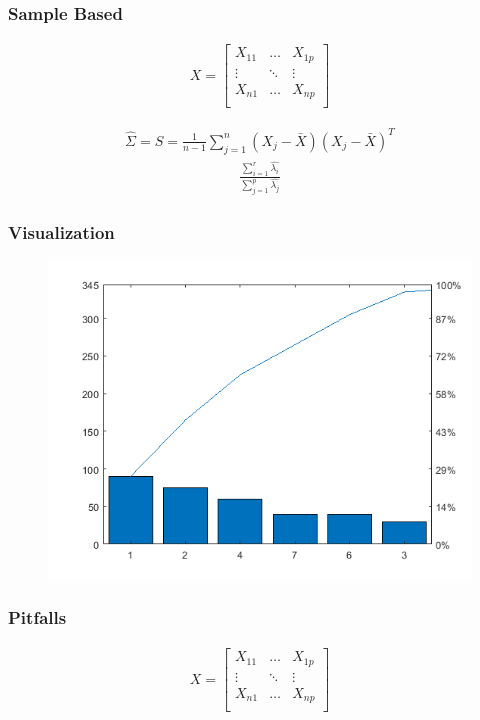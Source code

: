\documentclass[aspectratio=169,10pt,t]{beamer}
\begin{document}
\begin{frame}[t]
    \frametitle{Sample Based}

    \begin{align*}
    X = \begin{bmatrix}
			X_{11} & \hdots & X_{1p} \\
        \vdots &  \ddots & \vdots  \\
				X_{n1} & \hdots & X_{np} \\
    \end{bmatrix}
    \end{align*}

    \begin{align*}
        \hat{\Sigma} = S = \frac{1}{n-1} \sum^{n}_{j=1} (X_j - \bar{X} )(X_j - \bar{X} )^T
    \end{align*}
   \begin{align*}
    \frac{ \sum^{r}_{i=1} \hat{\lambda_i}  }{ \sum^{p}_{j=1} \hat{\lambda_j}  }
   \end{align*}
    

    
\end{frame}

\begin{frame}[t]
	\frametitle{Visualization}
	\begin{figure}[h]
		\centering
		\includegraphics[width=0.65\linewidth]{images/Pareto_chart_of_titanium_investment_casting_defects.svg.png}
	\end{figure}
	
\end{frame}

\begin{frame}[t]
    \frametitle{Pitfalls}

    \begin{align*}
    X = \begin{bmatrix}
			X_{11} & \hdots & X_{1p} \\
        \vdots &  \ddots & \vdots  \\
				X_{n1} & \hdots & X_{np} \\
    \end{bmatrix}
    \end{align*}

    
\end{frame}
\end{document}

